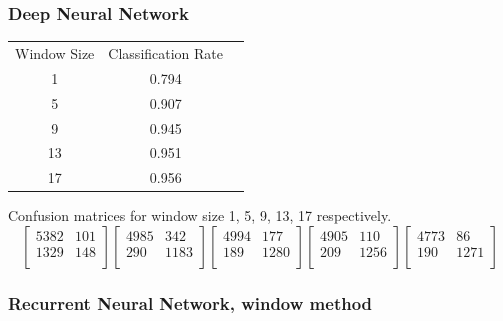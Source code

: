 \documentclass[12pt,a4paper]{article}
\begin{document}
\subsubsection{Deep Neural Network}
\begin{center}
\begin{tabular}{ c c c }

Window Size & Classification Rate \\
 1 & 0.794 \\
 5 & 0.907 \\
 9 & 0.945 \\
 13 & 0.951 \\
 17 &0.956 \\
\end{tabular}
\end{center}
Confusion matrices for window size 1, 5, 9, 13, 17 respectively.  
\[
  \begin{bmatrix}
5382 & 101 \\
1329  &148 \\
  \end{bmatrix} 
  \begin{bmatrix}
4985  & 342\\
290 & 1183\\
   \end{bmatrix}
  \begin{bmatrix}
4994  &177\\
189  &1280\\
   \end{bmatrix}
  \begin{bmatrix}
4905 & 110\\
209 & 1256\\
   \end{bmatrix}
  \begin{bmatrix}
4773  & 86\\
190  &1271\\
   \end{bmatrix}
\]
\subsubsection{Recurrent Neural Network, window method}
\end{document}
